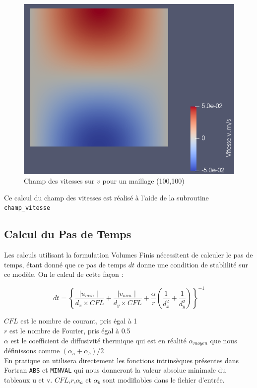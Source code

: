 \documentclass[a4paper,oneside]{article}
\begin{document}
\begin{figure}[h!]
	\centering
        \includegraphics[scale=0.4]{Champ_Vitesse_Maillage/Champ_Vitesse_v.png}
        \caption{Champ des vitesses sur $v$ pour un maillage (100,100)}
\end{figure}

Ce calcul du champ des vitesses est réalisé à l'aide de la subroutine \verb?champ_vitesse?

\subsection{Calcul du Pas de Temps}

Les calculs utilisant la formulation Volumes Finis nécessitent de calculer le pas de temps, étant donné que ce pas de temps $dt$ donne une condition de stablilité sur ce modèle. On le calcul de cette façon :

\[
	dt =  \left\{ \frac{\mid u_{min}\mid}{d_x \times CFL} +\frac{\mid v_{min}\mid}{d_y \times CFL} + \frac{\alpha}{r}\left(\frac{1}{d_x^2} + \frac{1}{d_y^2}\right) \right\}^{-1}
\]

\noindent $CFL$ est le nombre de courant, pris égal à 1\\
$r$ est le nombre de Fourier, pris égal à 0.5\\
$\alpha$ est le coefficient de diffusivité thermique qui est en réalité $\alpha_{moyen}$ que nous définissons comme $(\alpha_a + \alpha_b)/2$\\

En pratique on utilisera directement les fonctions intrinsèques présentes dans Fortran \verb?ABS? et \verb?MINVAL? qui nous donneront la valeur absolue minimale du tableaux u et v.
$CFL$,$r$,$\alpha_a$ et $\alpha_b$ sont modifiables dans le fichier d'entrée.
\end{document}
